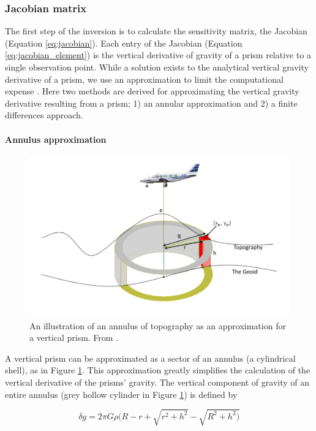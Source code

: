 \subsubsection{Jacobian matrix} \label{chp3:jacobian_methods}

The first step of the inversion is to calculate the sensitivity matrix, the Jacobian (Equation \ref{eq:jacobian}). Each entry of the Jacobian (Equation \ref{eq:jacobian_element}) is the vertical derivative of gravity of a prism relative to a single observation point. While a solution exists to the analytical vertical gravity derivative of a prism, we use an approximation to limit the computational expense \citep{nagygravitational2000}. Here two methods are derived for approximating the vertical gravity derivative resulting from a prism; 1) an annular approximation and 2) a finite differences approach.

\paragraph*{Annulus approximation}

\begin{figure}[!ht]
  \centering
  \includegraphics[width=0.7\linewidth]{figures/chp3/chp3_annulus.png}
  \caption[Annulus approximation of a vertical prism]{
    An illustration of an annulus of topography as an approximation for a vertical prism. From \citet{mccubbineairborne2016}.
  }
  \label{fig:chp3_annulus}
\end{figure}

A vertical prism can be approximated as a sector of an annulus (a cylindrical shell), as in Figure \ref{fig:chp3_annulus}. This approximation greatly simplifies the calculation of the vertical derivative of the prisms' gravity. The vertical component of gravity of an entire annulus (grey hollow cylinder in Figure \ref{fig:chp3_annulus}) is defined by

\begin{equation} \label{eq:annulus_gravity}
\delta g = 2 \pi G \rho (R - r + \sqrt{r^2 + h^2} - \sqrt{R^2 + h^2)}
\end{equation}

